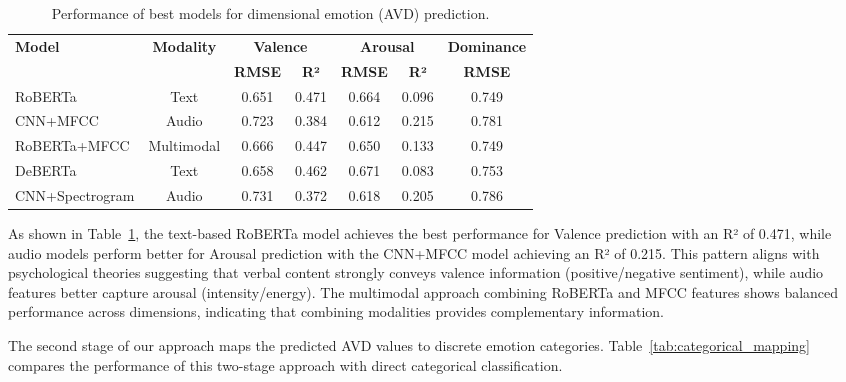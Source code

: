 \documentclass[12pt]{article}
\begin{document}
\begin{table}[h]
\centering
\caption{Performance of best models for dimensional emotion (AVD) prediction.}
\label{tab:avd_prediction}
\begin{tabular}{|l|c|c|c|c|c|c|}
\hline
\textbf{Model} & \textbf{Modality} & \multicolumn{2}{c|}{\textbf{Valence}} & \multicolumn{2}{c|}{\textbf{Arousal}} & \textbf{Dominance} \\
\cline{3-7}
 & & \textbf{RMSE} & \textbf{R²} & \textbf{RMSE} & \textbf{R²} & \textbf{RMSE} \\
\hline
RoBERTa & Text & 0.651 & 0.471 & 0.664 & 0.096 & 0.749 \\
\hline
CNN+MFCC & Audio & 0.723 & 0.384 & 0.612 & 0.215 & 0.781 \\
\hline
RoBERTa+MFCC & Multimodal & 0.666 & 0.447 & 0.650 & 0.133 & 0.749 \\
\hline
DeBERTa & Text & 0.658 & 0.462 & 0.671 & 0.083 & 0.753 \\
\hline
CNN+Spectrogram & Audio & 0.731 & 0.372 & 0.618 & 0.205 & 0.786 \\
\hline
\end{tabular}
\end{table}

As shown in Table~\ref{tab:avd_prediction}, the text-based RoBERTa model achieves the best performance for Valence prediction with an R² of 0.471, while audio models perform better for Arousal prediction with the CNN+MFCC model achieving an R² of 0.215. This pattern aligns with psychological theories suggesting that verbal content strongly conveys valence information (positive/negative sentiment), while audio features better capture arousal (intensity/energy). The multimodal approach combining RoBERTa and MFCC features shows balanced performance across dimensions, indicating that combining modalities provides complementary information.

The second stage of our approach maps the predicted AVD values to discrete emotion categories. Table~\ref{tab:categorical_mapping} compares the performance of this two-stage approach with direct categorical classification.
\end{document}
